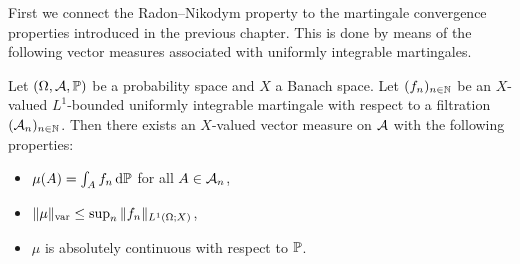 First we connect the Radon--Nikodym property to the martingale convergence properties introduced in the previous chapter.
This is done by means of the following vector measures associated with uniformly integrable martingales.

\begin{thm}\label{thm:martingale-measure}
  Let $(\Omega,\mc{A},\P)$ be a probability space and $X$ a Banach space.
  Let $(f_n)_{n \in \N}$ be an $X$-valued $L^1$-bounded uniformly integrable martingale with respect to a filtration $(\mc{A}_{n})_{n \in \N}$.
  Then there exists an $X$-valued vector measure on $\mc{A}$ with the following properties:
  \begin{itemize}
  \item $\mu(A) = \int_{A} f_n \, \dd\P$ for all $A \in \mc{A}_{n}$,
  \item $\|\mu\|_{\var} \leq \sup_{n} \|f_n\|_{L^1(\Omega;X)}$,
  \item $\mu$ is absolutely continuous with respect to $\P$.
  \end{itemize}
\end{thm}

